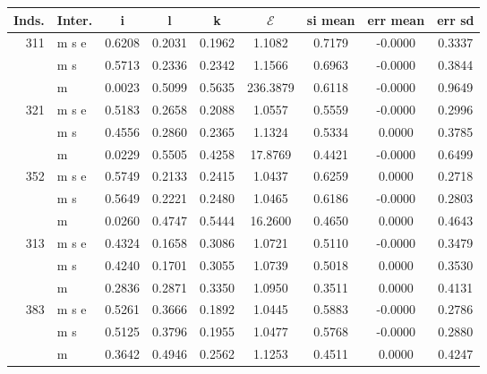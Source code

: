 \documentclass{standalone}
\begin{document}
\begin{tabular}{rlccccccc} \toprule
Inds.& Inter.& i  & l  & k  & $\mathcal{E}$  & si mean  & err mean  & err sd  \\  \hline
311& m s e &    0.6208 &    0.2031 &    0.1962 &    1.1082 &    0.7179 &   -0.0000 &    0.3337 \\  
& m s &    0.5713 &    0.2336 &    0.2342 &    1.1566 &    0.6963 &   -0.0000 &    0.3844 \\  
& m &    0.0023 &    0.5099 &    0.5635 &  236.3879 &    0.6118 &   -0.0000 &    0.9649 \\  \hline
321& m s e &    0.5183 &    0.2658 &    0.2088 &    1.0557 &    0.5559 &   -0.0000 &    0.2996 \\  
& m s &    0.4556 &    0.2860 &    0.2365 &    1.1324 &    0.5334 &    0.0000 &    0.3785 \\  
& m &    0.0229 &    0.5505 &    0.4258 &   17.8769 &    0.4421 &   -0.0000 &    0.6499 \\ \hline
352& m s e &    0.5749 &    0.2133 &    0.2415 &    1.0437 &    0.6259 &    0.0000 &    0.2718 \\  
& m s &    0.5649 &    0.2221 &    0.2480 &    1.0465 &    0.6186 &   -0.0000 &    0.2803 \\  
& m &    0.0260 &    0.4747 &    0.5444 &   16.2600 &    0.4650 &    0.0000 &    0.4643 \\ \hline
313& m s e &    0.4324 &    0.1658 &    0.3086 &    1.0721 &    0.5110 &   -0.0000 &    0.3479 \\  
& m s &    0.4240 &    0.1701 &    0.3055 &    1.0739 &    0.5018 &    0.0000 &    0.3530 \\  
& m &    0.2836 &    0.2871 &    0.3350 &    1.0950 &    0.3511 &    0.0000 &    0.4131 \\ \hline
383& m s e &    0.5261 &    0.3666 &    0.1892 &    1.0445 &    0.5883 &   -0.0000 &    0.2786 \\  
& m s &    0.5125 &    0.3796 &    0.1955 &    1.0477 &    0.5768 &   -0.0000 &    0.2880 \\  
& m &    0.3642 &    0.4946 &    0.2562 &    1.1253 &    0.4511 &    0.0000 &    0.4247 \\ 
\bottomrule \end{tabular}
\end{document}
